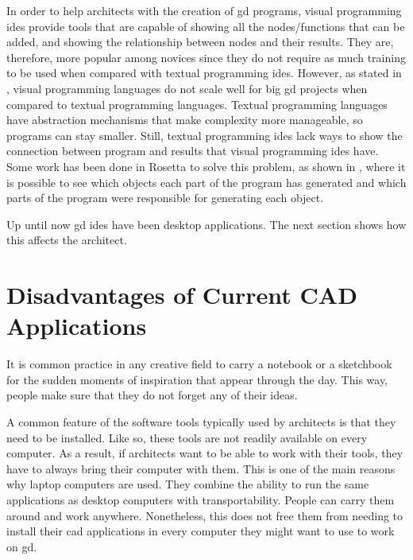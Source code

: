 In order to help architects with the creation of \gls{gd} programs, visual programming \glspl{ide} provide tools that are capable of showing all the nodes/functions that can be added, and showing the relationship between nodes and their results.
They are, therefore, more popular among novices since they do not require as much training to be used when compared with textual programming \glspl{ide}.
However, as stated in \cite{leitao2012programming}, visual programming languages do not scale well for big \gls{gd} projects when compared to textual programming languages.
Textual programming languages have abstraction mechanisms that make complexity more manageable, so programs can stay smaller.
Still, textual programming \glspl{ide} lack ways to show the connection between program and results that visual programming \glspl{ide} have.
Some work has been done in Rosetta to solve this problem, as shown in \cite{Leitao2014illustrated}, where it is possible to see which objects each part of the program has generated and which parts of the program were responsible for generating each object.

Up until now \gls{gd} \glspl{ide} have been desktop applications.
The next section shows how this affects the architect.


\section{Disadvantages of Current CAD Applications}
It is common practice in any creative field to carry a notebook or a sketchbook for the sudden moments of inspiration that appear through the day.
This way, people make sure that they do not forget any of their ideas.

A common feature of the software tools typically used by architects is that they need to be installed.
Like so, these tools are not readily available on every computer.
As a result, if architects want to be able to work with their tools, they have to always bring their computer with them.
This is one of the main reasons why laptop computers are used.
They combine the ability to run the same applications as desktop computers with transportability.
People can carry them around and work anywhere.
Nonetheless, this does not free them from needing to install their \gls{cad} applications in every computer they might want to use to work on \gls{gd}.

